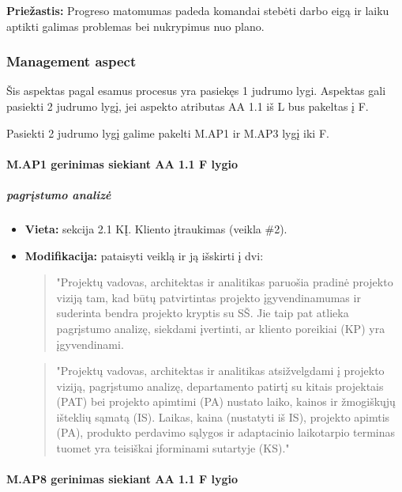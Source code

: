 \documentclass{article}
\begin{document}
\textbf{Priežastis:} Progreso matomumas padeda komandai stebėti darbo eigą ir laiku aptikti galimas problemas bei nukrypimus nuo plano.

\subsubsection{Management aspect}

Šis aspektas pagal esamus procesus yra pasiekęs 1 judrumo lygi. Aspektas gali pasiekti 2 judrumo lygį, jei
aspekto atributas AA 1.1 iš L bus pakeltas į F.

Pasiekti 2 judrumo lygį galime pakelti M.AP1 ir M.AP3 lygį iki F.

\paragraph{M.AP1 gerinimas siekiant AA 1.1 F lygio}

\subparagraph{pagrįstumo analizė}
\begin{itemize}
    \item \textbf{Vieta:} sekcija 2.1 KĮ. Kliento įtraukimas (veikla \#2).
    \item \textbf{Modifikacija:} pataisyti veiklą ir ją išskirti į dvi:
    \begin{quote}
        "Projektų vadovas, architektas ir analitikas paruošia pradinė projekto viziją tam, kad būtų patvirtintas projekto įgyvendinamumas ir suderinta bendra projekto kryptis su SŠ. Jie taip pat atlieka pagrįstumo analizę, siekdami įvertinti, ar kliento poreikiai (KP) yra įgyvendinami. 
    \end{quote}
    
    \begin{quote}
        "Projektų vadovas, architektas ir analitikas  atsižvelgdami į projekto viziją, pagrįstumo analizę, departamento patirtį su kitais projektais (PAT) bei projekto apimtimi (PA) nustato laiko, kainos ir žmogiškųjų išteklių sąmatą (IS). Laikas, kaina (nustatyti iš IS), projekto apimtis (PA), produkto perdavimo sąlygos ir adaptacinio laikotarpio terminas tuomet yra teisiškai įforminami sutartyje (KS)."
    \end{quote}
\end{itemize}

\paragraph{M.AP8 gerinimas siekiant AA 1.1 F lygio}
\end{document}
